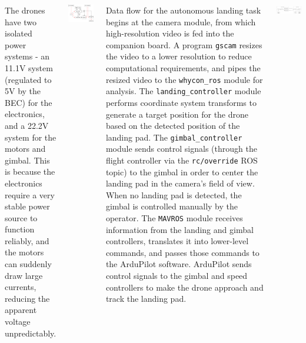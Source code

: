 \documentclass[a1paper, landscape, blockverticalspace=1cm, 14pt]{tikzposter}
\begin{document}
\begin{columns}
    {
        \normalsize
        The drones have two isolated power systems - an 11.1V system (regulated to 5V by the BEC) for the electronics, and a 22.2V system for the motors and gimbal.
        This is because the electronics require a very stable power source to function reliably, and the motors can suddenly draw large currents, reducing the apparent voltage unpredictably.
        \begin{tikzfigure}
            \includegraphics[width=0.7\linewidth]{hardware.png}
        \end{tikzfigure}

        Data flow for the autonomous landing task begins at the camera module, from which high-resolution video is fed into the companion board.
        A program \texttt{gscam} resizes the video to a lower resolution to reduce computational requirements, and pipes the resized video to the \texttt{whycon\_ros} module for analysis.
        The \texttt{landing\_controller} module performs coordinate system transforms to generate a target position for the drone based on the detected position of the landing pad.
        The \texttt{gimbal\_controller} module sends control signals (through the flight controller via the \texttt{rc/override} ROS topic) to the gimbal in order to center the landing pad in the camera's field of view.
        When no landing pad is detected, the gimbal is controlled manually by the operator.
        The \texttt{MAVROS} module receives information from the landing and gimbal controllers, translates it into lower-level commands, and passes those commands to the ArduPilot software.
        ArduPilot sends control signals to the gimbal and speed controllers to make the drone approach and track the landing pad.
        \begin{tikzfigure}
            \includegraphics[width=0.7\linewidth]{data_flow.png}
        \end{tikzfigure}
    }


\end{columns}
\end{document}
